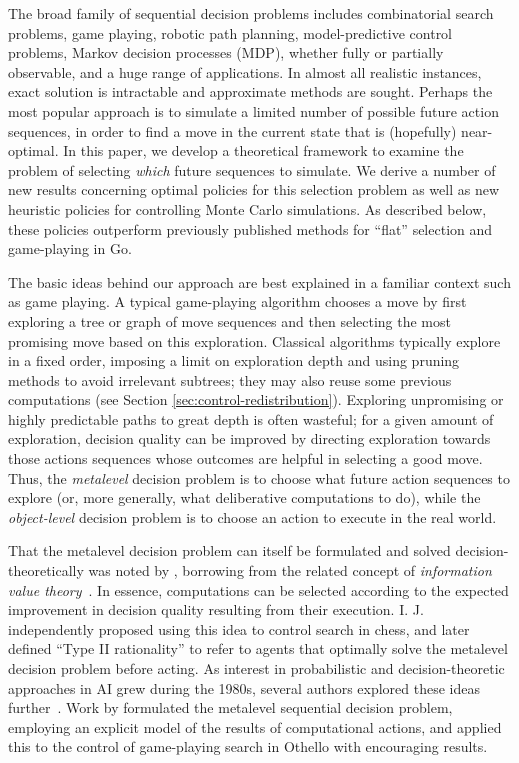The broad family of sequential decision problems includes
combinatorial search problems, game playing, robotic path planning,
model-predictive control problems, Markov decision processes (MDP), whether fully or
partially observable, and a huge range of applications. In almost all
realistic instances, exact solution is intractable and approximate
methods are sought. Perhaps the most popular approach is to simulate
a limited number of possible future action sequences, 
in order to find a move in the current state that is (hopefully)
near-optimal. In this paper, we develop a theoretical framework to examine the problem of selecting
{\em which} future sequences to simulate.
We derive a number of new results concerning optimal policies for this selection problem
as well as new heuristic policies for controlling Monte Carlo simulations.
As described below, these policies outperform previously published methods for
``flat'' selection and game-playing in Go.

The basic ideas behind our approach are best explained in a familiar
context such as game playing.  A typical game-playing algorithm
chooses a move by first exploring a tree or graph of move sequences
and then selecting the most promising move based on this exploration.
Classical algorithms typically explore in a fixed order, imposing a
limit on exploration depth and using pruning methods to avoid
irrelevant subtrees; they may also reuse some previous computations
(see Section \ref{sec:control-redistribution}).  Exploring unpromising
or highly predictable paths to great depth is often wasteful; for a
given amount of exploration, decision quality can be improved by
directing exploration towards those actions sequences whose outcomes
are helpful in selecting a good move. Thus, the {\em metalevel}
decision problem is to choose what future action sequences to explore
(or, more generally, what deliberative computations to do), while the
{\em object-level} decision problem is to choose an action to execute
in the real world.

That the metalevel decision problem can itself be formulated and
solved decision-theoretically was noted by \citet{Matheson:1968},
borrowing from the related concept of {\em information value
  theory}~\citep{Howard:1966}. In essence, computations can be
selected according to the expected improvement in decision quality
resulting from their execution. I. J.~\citet{Good:1968} independently
proposed using this idea to control search in chess, and later defined
``Type II rationality'' to refer to agents that optimally solve the
metalevel decision problem before acting. As interest in probabilistic
and decision-theoretic approaches in AI grew during the 1980s, several
authors explored these ideas further~\citep{Dean+Boddy:1988,Doyle:1988,Fehling+Breese:1988,Horvitz:1987b}.
Work by
\citet{Russell+Wefald:1988a,Russell+Wefald:1991a,Russell+Wefald:1991b}
formulated the metalevel sequential decision problem, employing an
explicit model of the results of computational actions, and applied
this to the control of game-playing search in Othello with encouraging
results.

